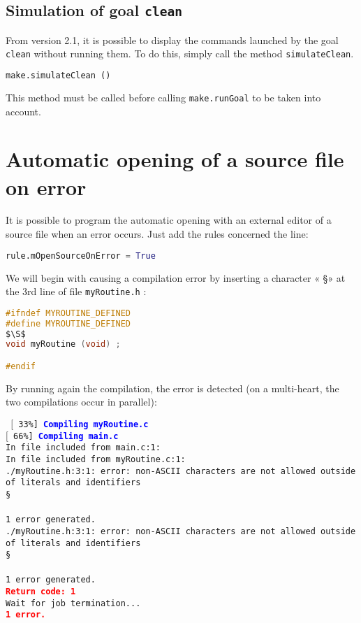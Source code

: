 \documentclass[a4paper,11pt]{extarticle}
\begin{document}
\subsection{Simulation of goal \texttt{clean}}\label{simulationButClean}

From version 2.1, it is possible to display the commands launched by the goal \texttt{clean} without running them. To do this, simply call the method \texttt{simulateClean}.

\begin{lstlisting}[language=py]
  make.simulateClean ()
\end{lstlisting}

This method must be called before calling \texttt{make.runGoal}  to be taken into account.

\section{Automatic opening of a source file on error}

It is possible to program the automatic opening with an external editor of a source file when an error occurs. Just add the rules concerned the line:
\begin{lstlisting}[language=py]
  rule.mOpenSourceOnError = True
\end{lstlisting}


We will begin with causing a compilation error by inserting a character « \S » at the 3rd line of file \texttt{myRoutine.h} :
\begin{lstlisting}[mathescape,language=C]
#ifndef MYROUTINE_DEFINED
#define MYROUTINE_DEFINED
$\S$
void myRoutine (void) ;

#endif
\end{lstlisting}

By running again the compilation, the error is detected (on a multi-heart, the two compilations occur in parallel):

\begin{mdframed}[hidealllines=true,backgroundcolor=lightgray!20]
\noindent\texttt{\footnotesize
$[$~33\%]~\textcolor{blue}{\bf Compiling myRoutine.c}\\
$[$~66\%]~\textcolor{blue}{\bf Compiling main.c}\\
In file included from main.c:1:\\
In file included from myRoutine.c:1:\\
./myRoutine.h:3:1: error: non-ASCII characters are not allowed outside of literals and identifiers\\
\S\\
\^\\
1 error generated.\\
./myRoutine.h:3:1: error: non-ASCII characters are not allowed outside of literals and identifiers\\
\S\\
\^\\
1 error generated.\\
\textcolor{red}{\bf Return code: 1}\\
Wait for job termination...\\
\textcolor{red}{\bf 1 error.}
}
\end{mdframed}
\end{document}
